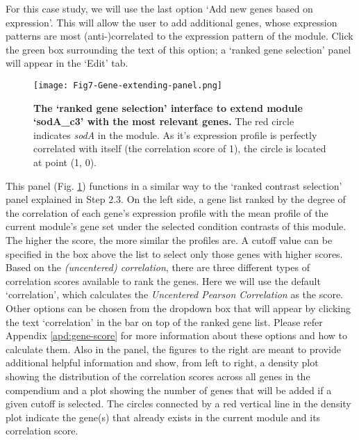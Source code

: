 \begin{adjustwidth}{5mm}{0cm}
For this case study, we will use the last option `Add new genes based on 
expression'. This will allow the user to add additional genes, whose expression 
patterns are most (anti-)correlated to the expression pattern of the module. 
Click the green box surrounding the text of this option; a `ranked gene 
selection' panel will appear in the `Edit' tab. 
\end{adjustwidth}

\begin{figure}[b]
	\centering
  	\texttt{[image: Fig7-Gene-extending-panel.png]}
	\caption[COLOMBOS `ranked gene selection' interface]{
	\textbf{The `ranked gene selection' interface to extend module `sodA\_c3' 
	with the most relevant genes.} 
	The red circle indicates \textit{sodA} in the module. As it's expression 
	profile is perfectly correlated with itself (the correlation score of 1), 
	the circle is located at point (1, 0).}
	\label{fig:colombos-gene-extend}
\end{figure}

\begin{adjustwidth}{5mm}{0cm}
This panel (Fig. \ref{fig:colombos-gene-extend}) functions in a similar way to 
the `ranked contrast selection' panel explained in Step 2.3. 
On the left side, a gene list ranked by the degree of the correlation of each 
gene's expression profile with the mean profile of the current module's gene 
set under the selected condition contrasts of this module. 
The higher the score, the more similar the profiles are. 
A cutoff value can be specified in the box above the list to select only those 
genes with higher scores. 
Based on the \textit{(uncentered) correlation}, there are three different 
types of correlation scores available to rank the genes. 
Here we will use the default `correlation', which calculates the 
\textit{Uncentered Pearson Correlation} as the score. 
Other options can be chosen from the dropdown box that will appear by clicking 
the text `correlation' in the bar on top of the ranked gene list. 
Please refer Appendix \ref{apd:gene-score} for more information 
about these options and how to calculate them. 
Also in the panel, the figures to the right are meant to provide additional 
helpful information and show, from left to right, 
a density plot showing the distribution of the 
correlation scores across all genes in the compendium and a plot showing the 
number of genes that will be added if a given cutoff is selected. The circles 
connected by a red vertical line in the density plot indicate the gene(s) that 
already exists in the current module and its correlation score. 
\end{adjustwidth}

